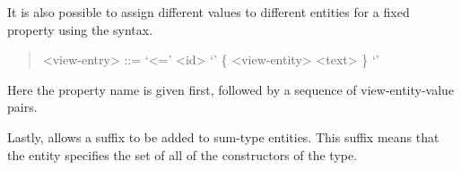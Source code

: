 It is also possible to assign different values to different entities for a fixed property
using the syntax.
%
\begin{quote}\begin{grammar}
  <view-entry> ::= `<=' <id> `{' \{ <view-entity> <text> \} `}'
\end{grammar}\end{quote}%
%
Here the property name is given first, followed by a sequence of view-entity-value pairs.

Lastly, \asdl{} allows a  suffix to be added to sum-type entities.
This suffix means that the entity specifies the set of all of the constructors of the type.

%
%
